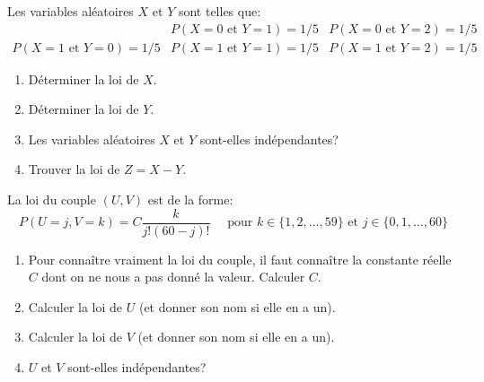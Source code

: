 \documentclass[a4paper,11pt,reqno]{amsart}
\begin{document}


\begin{exo}

  Les variables aléatoires $X$ et $Y$ sont telles que:
    $$
      \begin{array}{ccc}
                                   & P(X=0 \text{ et } Y=1)=1/5 & P(X=0 \text{ et } Y=2)=1/5 \\
        P(X=1 \text{ et } Y=0)=1/5 & P(X=1 \text{ et } Y=1)=1/5 & P(X=1 \text{ et } Y=2)=1/5
      \end{array}
    $$
  \begin{enumerate}
    \item Déterminer la loi de $X$.
    \item Déterminer la loi de $Y$.
    \item Les variables aléatoires $X$ et $Y$ sont-elles indépendantes?
    \item Trouver la loi de $Z = X-Y$.
  \end{enumerate}

\end{exo}

\begin{exo}

  La loi du couple $(U,V)$ est de la forme:
    $$
      P(U=j,V=k)=C\frac{k}{j!(60-j)!} \quad\text{ pour } k\in\{1,2,\ldots,59\} \text{ et } j\in\{0,1,\ldots,60\}
    $$
  \begin{enumerate}
    \item Pour connaître vraiment la loi du couple, il faut connaître la constante réelle $C$ dont on ne nous a pas donné la valeur. Calculer $C$.
    \item Calculer la loi de $U$ (et donner son nom si elle en a un).
    \item Calculer la loi de $V$ (et donner son nom si elle en a un).
    \item $U$ et $V$ sont-elles indépendantes?
  \end{enumerate}

\end{exo}
\end{document}
